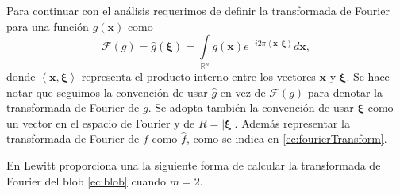 


Para continuar con el análisis requerimos de definir la transformada de Fourier para una función $g(\textbf{x})$ como
\begin{equation}
  \mathscr{F} (g) = \hat{g}(\bm \xi) = \int \limits_{\mathbb{R}^n} g(\textbf{x}) e^{-i 2 \pi \left\langle \textbf{x}, \bm \xi\right\rangle } d\textbf{x},
  \label{ec:fourierTransform}
\end{equation}
donde $\left\langle \textbf{x}, \bm \xi \right\rangle$ representa el producto interno entre los vectores $\textbf{x}$ y $\bm \xi$. Se hace notar que seguimos la convención de usar $\hat{g}$ en vez de $\mathscr{F} (g)$ para denotar la transformada de Fourier de $g$. Se adopta también la convención de usar $\bm \xi$ como un vector en el espacio de Fourier y de $R = |\bm \xi|$. Además representar la transformada de Fourier de $f$ como $\hat{f}$, como se indica en \eqref{ec:fourierTransform}.

En \cite{BlobsMate} Lewitt proporciona una la siguiente forma de calcular la transformada de Fourier del blob \eqref{ec:blob} cuando $m = 2$.

